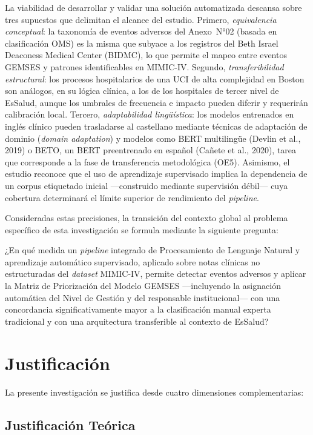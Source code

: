 \documentclass[12pt,a4paper,oneside]{book}
\begin{document}
La viabilidad de desarrollar y validar una solución automatizada descansa sobre tres supuestos que delimitan el alcance del estudio. Primero, \textit{equivalencia conceptual}: la taxonomía de eventos adversos del Anexo~N°02 (basada en clasificación OMS) es la misma que subyace a los registros del Beth Israel Deaconess Medical Center (BIDMC), lo que permite el mapeo entre eventos GEMSES y patrones identificables en MIMIC-IV. Segundo, \textit{transferibilidad estructural}: los procesos hospitalarios de una UCI de alta complejidad en Boston son análogos, en su lógica clínica, a los de los hospitales de tercer nivel de EsSalud, aunque los umbrales de frecuencia e impacto pueden diferir y requerirán calibración local. Tercero, \textit{adaptabilidad lingüística}: los modelos entrenados en inglés clínico pueden trasladarse al castellano mediante técnicas de adaptación de dominio (\textit{domain adaptation}) y modelos como BERT multilingüe (Devlin et al., 2019) o BETO, un BERT preentrenado en español (Cañete et al., 2020), tarea que corresponde a la fase de transferencia metodológica (OE5). Asimismo, el estudio reconoce que el uso de aprendizaje supervisado implica la dependencia de un corpus etiquetado inicial ---construido mediante supervisión débil--- cuya cobertura determinará el límite superior de rendimiento del \textit{pipeline}.

Consideradas estas precisiones, la transición del contexto global al problema específico de esta investigación se formula mediante la siguiente pregunta:

\noindent¿En qué medida un \textit{pipeline} integrado de Procesamiento de Lenguaje Natural y aprendizaje automático supervisado, aplicado sobre notas clínicas no estructuradas del \textit{dataset} MIMIC-IV, permite detectar eventos adversos y aplicar la Matriz de Priorización del Modelo GEMSES ---incluyendo la asignación automática del Nivel de Gestión y del responsable institucional--- con una concordancia significativamente mayor a la clasificación manual experta tradicional y con una arquitectura transferible al contexto de EsSalud?

\section{Justificación}

La presente investigación se justifica desde cuatro dimensiones complementarias:

\subsection{Justificación Teórica}
\end{document}
